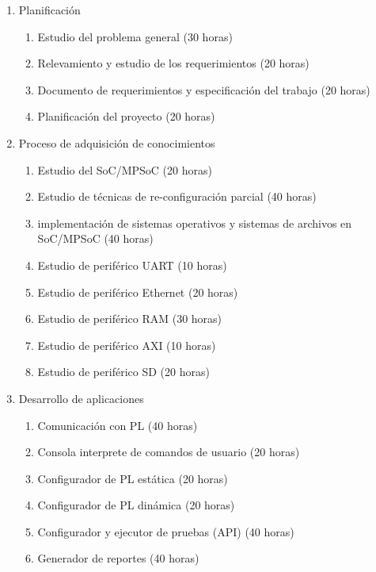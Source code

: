 \documentclass[
11pt, %
]{charter}
\begin{document}
\begin{enumerate}

	\item Planificación
	\begin{enumerate}
		\item Estudio del problema general (30 horas)
		\item Relevamiento y estudio de los requerimientos (20 horas)
		\item Documento de requerimientos y especificación del trabajo (20 horas)
		\item Planificación del proyecto (20 horas)		
	\end{enumerate}
	
	\item Proceso de adquisición de conocimientos
	\begin{enumerate}
		\item Estudio del SoC/MPSoC (20 horas)
		\item Estudio de técnicas de re-configuración parcial (40 horas)
		\item implementación de sistemas operativos y sistemas de archivos en SoC/MPSoC (40 horas)
		\item Estudio de periférico  UART (10 horas)
		\item Estudio de periférico  Ethernet (20 horas)
		\item Estudio de periférico  RAM (30 horas)
		\item Estudio de periférico  AXI (10 horas)
		\item Estudio de periférico  SD (20 horas)
	\end{enumerate}
	
	\item Desarrollo de aplicaciones
	\begin{enumerate}
		\item Comunicación con PL (40 horas)
		\item Consola interprete de comandos de usuario (20 horas)
		\item Configurador de PL estática (20 horas)
		\item Configurador de PL dinámica (20 horas)
		\item Configurador y ejecutor de pruebas (API) (40 horas)
		\item Generador de reportes (40 horas)
	\end{enumerate}
	

\end{enumerate}
\end{document}
